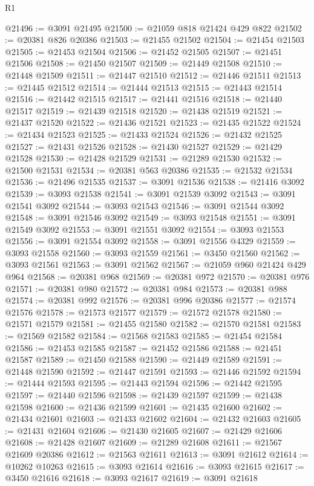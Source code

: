 \begin{lexlean}{R1}
\begin{coremodule}
@21496 := @3091 @21495
@21500 := @21059 @818 @21424 @429 @822
@21502 := @20381 @826 @20386
@21503 := @21455 @21502
@21504 := @21454 @21503
@21505 := @21453 @21504
@21506 := @21452 @21505
@21507 := @21451 @21506
@21508 := @21450 @21507
@21509 := @21449 @21508
@21510 := @21448 @21509
@21511 := @21447 @21510
@21512 := @21446 @21511
@21513 := @21445 @21512
@21514 := @21444 @21513
@21515 := @21443 @21514
@21516 := @21442 @21515
@21517 := @21441 @21516
@21518 := @21440 @21517
@21519 := @21439 @21518
@21520 := @21438 @21519
@21521 := @21437 @21520
@21522 := @21436 @21521
@21523 := @21435 @21522
@21524 := @21434 @21523
@21525 := @21433 @21524
@21526 := @21432 @21525
@21527 := @21431 @21526
@21528 := @21430 @21527
@21529 := @21429 @21528
@21530 := @21428 @21529
@21531 := @21289 @21530
@21532 := @21500 @21531
@21534 := @20381 @563 @20386
@21535 := @21532 @21534
@21536 := @21496 @21535
@21537 := @3091 @21536
@21538 := @21416 @3092
@21539 := @3093 @21538
@21541 := @3091 @21539 @3092
@21543 := @3091 @21541 @3092
@21544 := @3093 @21543
@21546 := @3091 @21544 @3092
@21548 := @3091 @21546 @3092
@21549 := @3093 @21548
@21551 := @3091 @21549 @3092
@21553 := @3091 @21551 @3092
@21554 := @3093 @21553
@21556 := @3091 @21554 @3092
@21558 := @3091 @21556 @4329
@21559 := @3093 @21558
@21560 := @3093 @21559
@21561 := @3450 @21560
@21562 := @3093 @21561
@21563 := @3091 @21562
@21567 := @21059 @960 @21424 @429 @964
@21568 := @20381 @968
@21569 := @20381 @972
@21570 := @20381 @976
@21571 := @20381 @980
@21572 := @20381 @984
@21573 := @20381 @988
@21574 := @20381 @992
@21576 := @20381 @996 @20386
@21577 := @21574 @21576
@21578 := @21573 @21577
@21579 := @21572 @21578
@21580 := @21571 @21579
@21581 := @21455 @21580
@21582 := @21570 @21581
@21583 := @21569 @21582
@21584 := @21568 @21583
@21585 := @21454 @21584
@21586 := @21453 @21585
@21587 := @21452 @21586
@21588 := @21451 @21587
@21589 := @21450 @21588
@21590 := @21449 @21589
@21591 := @21448 @21590
@21592 := @21447 @21591
@21593 := @21446 @21592
@21594 := @21444 @21593
@21595 := @21443 @21594
@21596 := @21442 @21595
@21597 := @21440 @21596
@21598 := @21439 @21597
@21599 := @21438 @21598
@21600 := @21436 @21599
@21601 := @21435 @21600
@21602 := @21434 @21601
@21603 := @21433 @21602
@21604 := @21432 @21603
@21605 := @21431 @21604
@21606 := @21430 @21605
@21607 := @21429 @21606
@21608 := @21428 @21607
@21609 := @21289 @21608
@21611 := @21567 @21609 @20386
@21612 := @21563 @21611
@21613 := @3091 @21612
@21614 := @10262 @10263
@21615 := @3093 @21614
@21616 := @3093 @21615
@21617 := @3450 @21616
@21618 := @3093 @21617
@21619 := @3091 @21618

\end{coremodule}
\end{lexlean}
